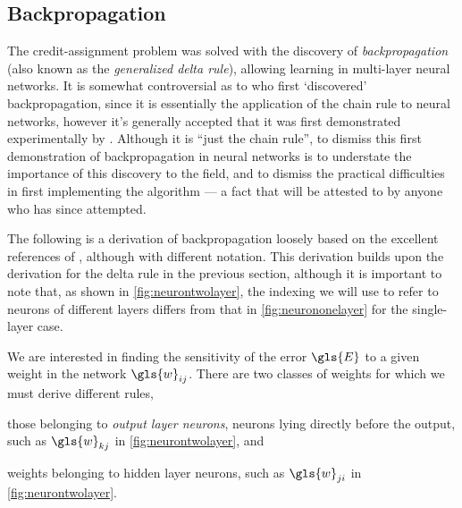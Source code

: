 \documentclass[thesis]{subfiles}
\begin{document}
\subsection{Backpropagation}
The credit-assignment problem was solved with the discovery of \emph{backpropagation} (also known as the \emph{generalized delta rule}), allowing learning in multi-layer neural networks. It is somewhat controversial as to who first `discovered' backpropagation, since it is essentially the application of the chain rule to neural networks, however it's generally accepted that it was first demonstrated experimentally by \citet{rumelhartbackprop}. Although it is ``just the chain rule'', to dismiss this first demonstration of backpropagation in neural networks is to understate the importance of this discovery to the field, and to dismiss the practical difficulties in first implementing the algorithm --- a fact that will be attested to by anyone who has since attempted.

The following is a derivation of backpropagation loosely based on the excellent references of \citet{haykin1994neural,Bishop1995}, although with different notation. This derivation builds upon the derivation for the delta rule in the previous section, although it is important to note that, as shown in \cref{fig:neurontwolayer}, the indexing we will use to refer to neurons of different layers differs from that in \cref{fig:neurononelayer} for the single-layer case.

We are interested in finding the sensitivity of the error $\gls{E}$ to a given weight in the network $\gls{w}_{ij}$. There are two classes of weights for which we must derive different rules, 
\begin{enumerate*}[label= (\textbf{\roman*})]
  \item\label{enum:outputneuron} those belonging to \emph{output layer neurons}, \ie neurons lying directly before the output, such as $\gls{w}_{kj}$ in \cref{fig:neurontwolayer}, and
  \item\label{enum:hiddenneuron} weights belonging to hidden layer neurons, such as $\gls{w}_{ji}$ in \cref{fig:neurontwolayer}.
\end{enumerate*}
%
\end{document}
